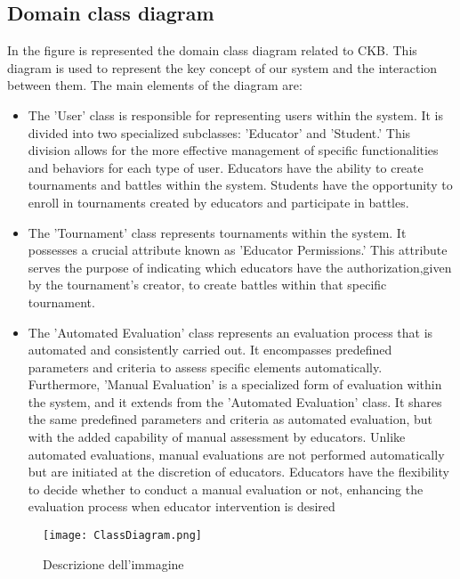 \subsection{Domain class diagram}
In the figure is represented the domain class diagram related to CKB. This diagram is used  to represent the key concept of our system and the interaction between them.
The main elements of the diagram are:
\begin{itemize}
    \item The 'User' class is responsible for representing users within the system. It is divided into two specialized subclasses: 'Educator' and 'Student.' This division allows for the more effective management of specific functionalities and behaviors for each type of user. Educators have the ability to create tournaments and battles within the system. Students have the opportunity to enroll in tournaments created by educators and participate in battles.
    \item The 'Tournament' class represents tournaments within the system. It possesses a crucial attribute known as 'Educator Permissions.' This attribute serves the purpose of indicating which educators have the authorization,given by the tournament's creator, to create battles within that specific tournament.
    \item  The 'Automated Evaluation' class represents an evaluation process that is automated and consistently carried out. It encompasses predefined parameters and criteria to assess specific elements automatically. Furthermore, 'Manual Evaluation' is a specialized form of evaluation within the system, and it extends from the 'Automated Evaluation' class. It shares the same predefined parameters and criteria as automated evaluation, but with the added capability of manual assessment by educators. Unlike automated evaluations, manual evaluations are not performed automatically but are initiated at the discretion of educators. Educators have the flexibility to decide whether to conduct a manual evaluation or not, enhancing the evaluation process when educator intervention is desired
\end{itemize}

\begin{figure}[h] %
  \centering %
  \texttt{[image: ClassDiagram.png]} %
  \caption{Descrizione dell'immagine} %
  \label{fig:etichetta} %
\end{figure}





